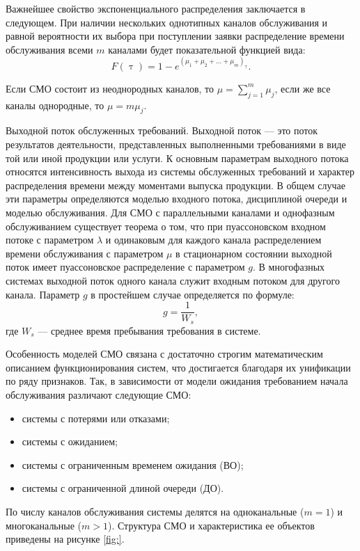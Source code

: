 Важнейшее свойство экспоненциального распределения заключается в следующем. При наличии нескольких однотипных каналов обслуживания и равной вероятности их выбора при поступлении заявки распределение времени обслуживания всеми $m$ каналами будет показательной функцией вида:
\[F(\uptau) = 1-e^{(\mu_1 +\mu_2 + ... + \mu_m)_{\uptau}}.\]

Если СМО состоит из неоднородных каналов, то $\mu = \sum\limits_{j=1}^m\mu_j$, если же все каналы однородные, то $\mu = m \mu_j$.

Выходной поток обслуженных требований. Выходной поток — это поток результатов деятельности, представленных выполненными требованиями в виде той или иной продукции или услуги. К основным параметрам выходного потока относятся интенсивность выхода из системы обслуженных требований и характер распределения времени между моментами выпуска продукции. В общем случае эти параметры определяются моделью входного потока, дисциплиной очереди и моделью обслуживания. Для СМО с параллельными каналами и однофазным обслуживанием существует теорема о том, что при пуассоновском входном потоке с параметром $\lambda$ и одинаковым для каждого канала распределением времени обслуживания с параметром $\mu$ в стационарном состоянии выходной поток имеет пуассоновское распределение с параметром $g$. В многофазных системах выходной поток одного канала служит входным потоком для другого канала. Параметр $g$ в простейшем случае определяется по формуле:
\[g=\dfrac{1}{W_s},\]
где $W_s$ --- среднее время пребывания требования в системе.

Особенность моделей СМО связана с достаточно строгим математическим описанием функционирования систем, что достигается благодаря их унификации по ряду признаков. Так, в зависимости от модели ожидания требованием начала обслуживания различают следующие СМО:
\begin{itemize}
	\item системы с потерями или отказами;
	\item системы с ожиданием;
	\item системы с ограниченным временем ожидания (ВО);
\item системы с ограниченной длиной очереди (ДО).
\end{itemize}

По числу каналов обслуживания системы делятся на одноканальные ($m = 1$) и многоканальные ($m > 1$). Структура СМО и характеристика ее объектов приведены на рисунке \ref{fig:}.

